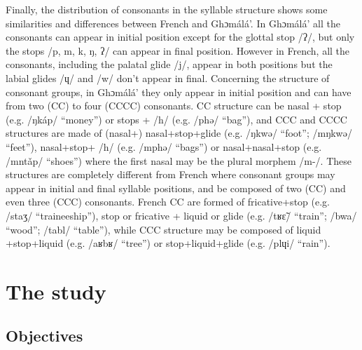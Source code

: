\documentclass[output=paper,newtxmath,modfonts,nonflat,draftmode]{langsci/langscibook}
\begin{document}
Finally, the distribution of consonants in the syllable structure shows some similarities and differences between French and Ghɔmálá’. In Ghɔmálá’ all the consonants can appear in initial position except for the glottal stop /ʔ/, but only the stops /p, m, k, ŋ, ʔ/ can appear in final position. However in French, all the consonants, including the palatal glide /j/, appear in both positions but the labial glides /ɥ/ and /w/ don’t appear in final. Concerning the structure of consonant groups, in Ghɔmálá’ they only appear in initial position and can have from two (CC) to four (CCCC) consonants. CC structure can be nasal + stop (e.g. /ŋkáp/ “money”) or stops + /h/ (e.g. /phə/ “bag”), and CCC and CCCC structures are made of (nasal+) nasal+stop+glide (e.g. /ŋkwə/ “foot”; /mŋkwə/ “feet”), nasal+stop+ /h/ (e.g. /mphə/ “bags”) or nasal+nasal+stop (e.g. /mntǎp/ “shoes”) where the first nasal may be the plural morphem /m-/. These structures are completely different from French where consonant groups may appear in initial and final syllable positions, and be composed of two (CC) and even three (CCC) consonants. French CC are formed of fricative+stop (e.g. /staʒ/ “traineeship”), stop or fricative + liquid or glide (e.g. /tʁɛ̃/ “train”; /bwa/ “wood”; /tabl/ “table”), while CCC structure may be composed of liquid +stop+liquid (e.g. /aʁbʁ/ “tree”) or stop+liquid+glide (e.g. /plɥi/ “rain”).

\section{The study} %
\subsection{Objectives} %
\end{document}

